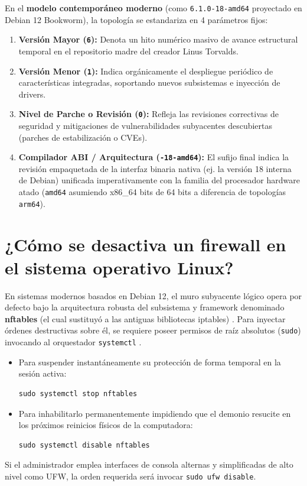 \documentclass[a4paper,12pt]{article}
\begin{document}
En el \textbf{modelo contemporáneo moderno} (como \texttt{6.1.0-18-amd64} proyectado en Debian 12 Bookworm), la topología se estandariza en 4 parámetros fijos:

\begin{enumerate}
    \item \textbf{Versión Mayor (\texttt{6}):} Denota un hito numérico masivo de avance estructural temporal en el repositorio madre del creador Linus Torvalds.
    \item \textbf{Versión Menor (\texttt{1}):} Indica orgánicamente el despliegue periódico de características integradas, soportando nuevos subsistemas e inyección de drivers.
    \item \textbf{Nivel de Parche o Revisión (\texttt{0}):} Refleja las revisiones correctivas de seguridad y mitigaciones de vulnerabilidades subyacentes descubiertas (parches de estabilización o CVEs).
    \item \textbf{Compilador ABI / Arquitectura (\texttt{-18-amd64}):} El sufijo final indica la revisión empaquetada de la interfaz binaria nativa (ej. la versión 18 interna de Debian) unificada imperativamente con la familia del procesador hardware atado (\texttt{amd64} asumiendo x86\_64 bits de 64 bits a diferencia de topologías \texttt{arm64}).
\end{enumerate}

\section{¿Cómo se desactiva un firewall en el sistema operativo Linux?}

En sistemas modernos basados en Debian 12, el muro subyacente lógico opera por defecto bajo la arquitectura robusta del subsistema y framework denominado \textbf{nftables} (el cual sustituyó a las antiguas bibliotecas iptables) \cite{ref70}. Para inyectar órdenes destructivas sobre él, se requiere poseer permisos de raíz absolutos (\texttt{sudo}) invocando al orquestador \texttt{systemctl} \cite{ref70}.

\begin{itemize}
    \item Para suspender instantáneamente su protección de forma temporal en la sesión activa:
    \begin{lstlisting}
sudo systemctl stop nftables
    \end{lstlisting}
    \item Para inhabilitarlo permanentemente impidiendo que el demonio resucite en los próximos reinicios físicos de la computadora:
    \begin{lstlisting}
sudo systemctl disable nftables
    \end{lstlisting}
\end{itemize}
Si el administrador emplea interfaces de consola alternas y simplificadas de alto nivel como UFW, la orden requerida será invocar \texttt{sudo ufw disable}.
\end{document}

